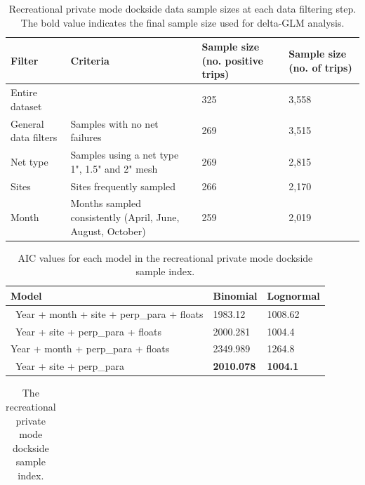 \documentclass[12pt,]{article}
\begin{document}
\begin{table}[ht]
\centering
\caption{Recreational private mode dockside data sample 
                                          sizes at each data filtering step.  
                                          The bold value indicates the final sample size 
                                          used for delta-GLM analysis.} 
\label{tab:Fleet9_GillnetSurvey_filter}
\begin{tabular}{>{\raggedright}p{1.5in}>{\raggedright}p{2.6in}>{\raggedright}p{1in}>{\raggedright}p{1in}}
  \hline
Filter & Criteria & Sample size (no. positive trips) & Sample size (no. of trips) \\ 
  \hline
Entire dataset &  & 325 & 3,558 \\ 
  General data filters & Samples with  no net failures & 269 & 3,515 \\ 
  Net type & Samples using a net type 1", 1.5" and 2" mesh & 269 & 2,815 \\ 
  Sites & Sites frequently sampled & 266 & 2,170 \\ 
  Month & Months sampled consistently (April, June, August, October) & 259 & 2,019 \\ 
   \hline
\end{tabular}
\end{table}\begin{table}[ht]
\centering
\caption{AIC values for each model in the
                                          recreational private mode dockside sample 
                                          index.} 
\label{tab:Fleet9_GillnetSurvey_aic}
\begin{tabular}{lll}
  \hline
Model & Binomial & Lognormal \\ 
  \hline
~Year + month + site + perp\_para + floats & 1983.12 & 1008.62 \\ 
  ~Year + site + perp\_para  + floats & 2000.281 & 1004.4 \\ 
   Year + month  + perp\_para + floats & 2349.989 & 1264.8 \\ 
  ~Year  + site +  perp\_para & \textbf{2010.078} & \textbf{1004.1} \\ 
   \hline
\end{tabular}
\end{table}\begin{table}[ht]
\centering
\caption{The recreational private mode 
                                            dockside sample index.} 
\label{tab:Fleet9_GillnetSurvey_index}
\begin{tabular}{rrr}
  \hline

\end{tabular}
\end{table}
\end{document}
